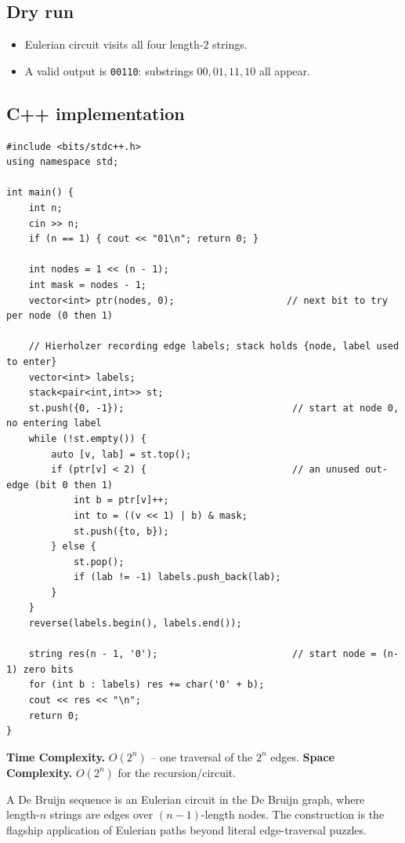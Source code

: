 \subsection*{Dry run}


\begin{itemize}
  \item Eulerian circuit visits all four length-$2$ strings.
  \item A valid output is \texttt{00110}: substrings $00,01,11,10$ all
        appear.
\end{itemize}

\subsection*{C++ implementation}

\begin{lstlisting}
#include <bits/stdc++.h>
using namespace std;

int main() {
    int n;
    cin >> n;
    if (n == 1) { cout << "01\n"; return 0; }

    int nodes = 1 << (n - 1);
    int mask = nodes - 1;
    vector<int> ptr(nodes, 0);                    // next bit to try per node (0 then 1)

    // Hierholzer recording edge labels; stack holds {node, label used to enter}
    vector<int> labels;
    stack<pair<int,int>> st;
    st.push({0, -1});                              // start at node 0, no entering label
    while (!st.empty()) {
        auto [v, lab] = st.top();
        if (ptr[v] < 2) {                          // an unused out-edge (bit 0 then 1)
            int b = ptr[v]++;
            int to = ((v << 1) | b) & mask;
            st.push({to, b});
        } else {
            st.pop();
            if (lab != -1) labels.push_back(lab);
        }
    }
    reverse(labels.begin(), labels.end());

    string res(n - 1, '0');                        // start node = (n-1) zero bits
    for (int b : labels) res += char('0' + b);
    cout << res << "\n";
    return 0;
}
\end{lstlisting}

\begin{complexitybox}
\textbf{Time Complexity.} $O(2^n)$ -- one traversal of the $2^n$ edges.
\textbf{Space Complexity.} $O(2^n)$ for the recursion/circuit.
\end{complexitybox}

\begin{takeawaybox}
A De Bruijn sequence is an Eulerian circuit in the De Bruijn graph, where
length-$n$ strings are edges over $(n-1)$-length nodes. The construction is
the flagship application of Eulerian paths beyond literal edge-traversal
puzzles.
\end{takeawaybox}
